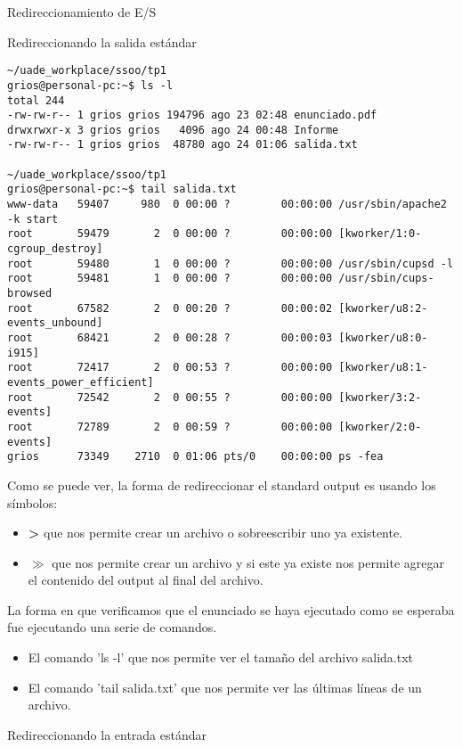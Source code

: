 \begin{section}{Redireccionamiento de E/S}
\begin{subsection}{Redireccionando la salida estándar}
\begin{lstlisting}[style=Ubuntu]
~/uade_workplace/ssoo/tp1
grios@personal-pc:~$ ls -l                
total 244
-rw-rw-r-- 1 grios grios 194796 ago 23 02:48 enunciado.pdf
drwxrwxr-x 3 grios grios   4096 ago 24 00:48 Informe
-rw-rw-r-- 1 grios grios  48780 ago 24 01:06 salida.txt

~/uade_workplace/ssoo/tp1
grios@personal-pc:~$ tail salida.txt      
www-data   59407     980  0 00:00 ?        00:00:00 /usr/sbin/apache2 -k start
root       59479       2  0 00:00 ?        00:00:00 [kworker/1:0-cgroup_destroy]
root       59480       1  0 00:00 ?        00:00:00 /usr/sbin/cupsd -l
root       59481       1  0 00:00 ?        00:00:00 /usr/sbin/cups-browsed
root       67582       2  0 00:20 ?        00:00:02 [kworker/u8:2-events_unbound]
root       68421       2  0 00:28 ?        00:00:03 [kworker/u8:0-i915]
root       72417       2  0 00:53 ?        00:00:00 [kworker/u8:1-events_power_efficient]
root       72542       2  0 00:55 ?        00:00:00 [kworker/3:2-events]
root       72789       2  0 00:59 ?        00:00:00 [kworker/2:0-events]
grios      73349    2710  0 01:06 pts/0    00:00:00 ps -fea

\end{lstlisting}

Como se puede ver, la forma de redireccionar el standard output es usando los símbolos:

\begin{itemize}
	\item \textbf{>} que nos permite crear un archivo o sobreescribir uno ya existente. 
	\item \textbf{\(\gg\)} que nos permite crear un archivo y si este ya existe nos permite agregar el contenido del output al final del archivo.
\end{itemize}

La forma en que verificamos que el enunciado se haya ejecutado como se esperaba fue ejecutando una serie de comandos. 
\begin{itemize}
	\item El comando 'ls -l' que nos permite ver el tamaño del archivo salida.txt
	\item El comando 'tail salida.txt' que nos permite ver las últimas líneas de un archivo.
\end{itemize}

\end{subsection}

\begin{subsection}{Redireccionando la entrada estándar}


\end{subsection}
\end{section}
